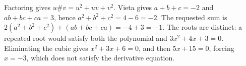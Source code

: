 Factoring gives $u\#v=u^2+uv+v^2$. Vieta gives $a+b+c=-2$ and $ab+bc+ca=3$, hence $a^2+b^2+c^2=4-6=-2$. The requested sum is $2(a^2+b^2+c^2)+(ab+bc+ca)=-4+3=\boxed{-1}$. The roots are distinct: a repeated root would satisfy both the polynomial and $3x^2+4x+3=0$. Eliminating the cubic gives $x^2+3x+6=0$, and then $5x+15=0$, forcing $x=-3$, which does not satisfy the derivative equation.
